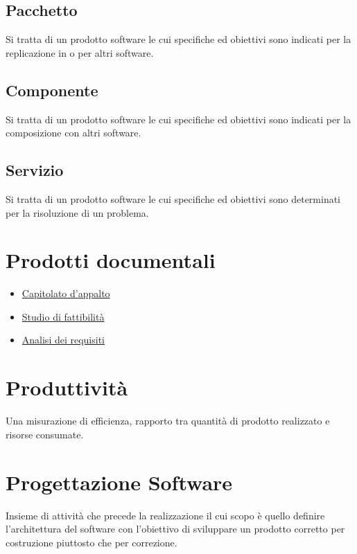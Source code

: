 		\subsection{Pacchetto}
		Si tratta di un prodotto software le cui specifiche ed obiettivi sono indicati per la replicazione in o per altri software.
		
		\subsection{Componente}
		Si tratta di un prodotto software le cui specifiche ed obiettivi sono indicati per la composizione con altri software.
		
		\subsection{Servizio}
		Si tratta di un prodotto software le cui specifiche ed obiettivi sono determinati per la risoluzione di un problema.
	
	\section{Prodotti documentali}	
	\label{sec:prodottidocumentali}
	\begin{itemize}  
	\item \hyperref[sec:capitolato]{Capitolato d'appalto}
	\item \hyperref[sec:studiofattibilita]{Studio di fattibilità}
	\item \hyperref[sec:analisirequisiti]{Analisi dei requisiti} 
	\end{itemize}	
		
	\section{Produttività}	
	\label{sec:produttivita}
	Una misurazione di efficienza, rapporto tra quantità di prodotto realizzato e risorse consumate.

	\section{Progettazione Software}
	\label{sec:progettazionesoftware}
	Insieme di attività che precede la realizzazione il cui scopo è quello definire l'architettura del software con l'obiettivo di sviluppare un prodotto corretto per costruzione piuttosto che per correzione.
	

